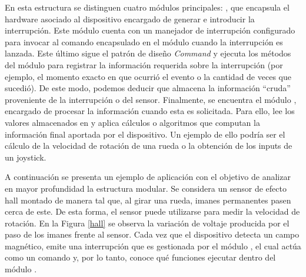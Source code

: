\begin{figure}[H]
\label{fig:ConnectBufferToMCU}
\end{figure}


En esta estructura se distinguen cuatro módulos principales: \Dispositivo, que encapsula el hardware asociado al dispositivo encargado de generar e introducir la interrupción. Este módulo cuenta con un manejador de interrupción configurado para invocar al comando encapsulado en el módulo \Comando cuando la interrupción es lanzada. Este último sigue el patrón de diseño \textit{Command} y ejecuta los métodos del módulo \Colector para registrar la información requerida sobre la interrupción (por ejemplo, el momento exacto en que ocurrió el evento o la cantidad de veces que sucedió). De este modo, podemos deducir que \Colector almacena la información ``cruda'' proveniente de la interrupción o del sensor. Finalmente, se encuentra el módulo \Computador, encargado de procesar la información cuando esta es solicitada. Para ello, lee los valores almacenados en \Colector y aplica cálculos o algoritmos que computan la información final aportada por el dispositivo. Un ejemplo de ello podría ser el cálculo de la velocidad de rotación de una rueda o la obtención de los inputs de un joystick.

A continuación se presenta un ejemplo de aplicación con el objetivo de analizar en mayor profundidad la estructura modular. Se considera un sensor de efecto \gls{hall} montado de manera tal que, al girar una rueda, imanes permanentes pasen cerca de este. De esta forma, el sensor puede utilizarse para medir la velocidad de rotación. En la Figura \ref{hall} se observa la variación de voltaje producida por el paso de los imanes frente al sensor. Cada vez que el dispositivo detecta un campo magnético, emite una interrupción que es gestionada por el módulo \Comando, el cual actúa como un comando y, por lo tanto, conoce qué funciones ejecutar dentro del módulo \Colector.

